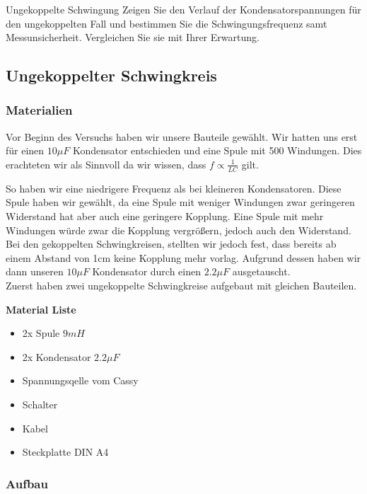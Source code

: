 \documentclass[twoside]{protokoll}
\begin{document}
\begin{aufgabe}{Ungekoppelte Schwingung}
  Zeigen Sie den Verlauf der Kondensatorspannungen für den
  ungekoppelten Fall und bestimmen Sie die Schwingungsfrequenz samt
  Messunsicherheit. Vergleichen Sie sie mit Ihrer Erwartung.
\end{aufgabe}

\subsection{Ungekoppelter Schwingkreis}

\subsubsection{Materialien}


Vor Beginn des Versuchs haben wir unsere Bauteile gewählt. Wir hatten uns erst für einen $10\mu F$ Kondensator entschieden und eine Spule mit 500 Windungen.
Dies erachteten wir als Sinnvoll da wir wissen, dass $ f \propto \frac{1}{LC}$ gilt. 

So haben wir eine niedrigere Frequenz als bei kleineren Kondensatoren. 
Diese Spule haben wir gewählt, da eine Spule mit weniger Windungen zwar geringeren Widerstand hat aber auch eine geringere Kopplung. Eine Spule mit mehr Windungen würde zwar die Kopplung vergrößern, jedoch auch den Widerstand. \\

Bei den gekoppelten Schwingkreisen, stellten wir jedoch fest, dass bereits ab einem Abstand von 1cm keine Kopplung mehr vorlag. 
Aufgrund dessen haben wir dann unseren $10\mu F$ Kondensator durch einen $2.2 \mu F$ ausgetauscht. \\


Zuerst haben zwei ungekoppelte Schwingkreise aufgebaut mit gleichen Bauteilen.
 
\textbf{Material Liste}
\begin{itemize}
  \item 2x Spule $9mH$
  \item 2x Kondensator $2.2 \mu F$
  \item Spannungsqelle vom Cassy
  \item Schalter
  \item Kabel
  \item Steckplatte DIN A4
\end{itemize}

\subsubsection{Aufbau}
\end{document}
